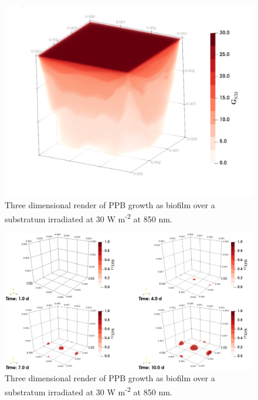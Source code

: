 \begin{figure}[tp]
    \centering
    \includegraphics[width=\textwidth,height=0.5\textheight]{Chap4/results/post_processing/renders/case6_3D/case6_3D_rad.pdf}
    \caption{Three dimensional render of PPB growth as biofilm over a substratum irradiated at 30 W m\textsuperscript{-2} at 850 nm. } 
    \label{fig:case6_3D_rad}
\end{figure}

\begin{figure}[tp]
    \centering
    \includegraphics[width=\textwidth,height=0.5\textheight]{Chap4/results/post_processing/renders/case6_3D/case6_ppb_3D.png}
    \caption{Three dimensional render of PPB growth as biofilm over a substratum irradiated at 30 W m\textsuperscript{-2} at 850 nm. } 
    \label{fig:case6_3D_ppb}
\end{figure}











